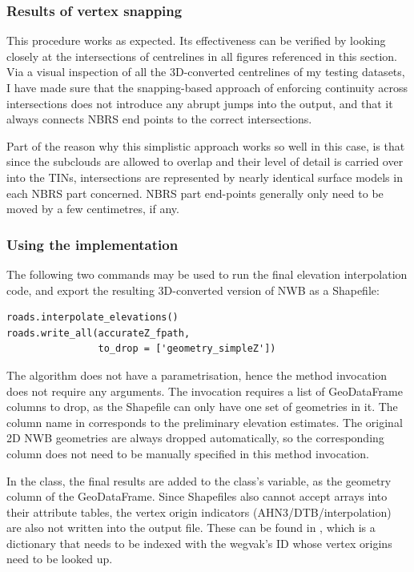 \subsubsection{Results of vertex snapping}

This procedure works as expected. Its effectiveness can be verified by looking closely at the intersections of centrelines in all figures referenced in this section. Via a visual inspection of all the 3D-converted centrelines of my testing datasets,  I have made sure that the snapping-based approach of enforcing continuity across intersections does not introduce any abrupt jumps into the output, and that it always connects NBRS end points to the correct intersections.

Part of the reason why this simplistic approach works so well in this case, is that since the subclouds are allowed to overlap and their level of detail is carried over into the TINs, intersections are represented by nearly identical surface models in each NBRS part concerned. NBRS part end-points generally only need to be moved by a few centimetres, if any.

\subsubsection{Using the implementation}

The following two commands may be used to run the final elevation interpolation code, and export the resulting 3D-converted version of NWB as a Shapefile:

\begin{lstlisting}
roads.interpolate_elevations()
roads.write_all(accurateZ_fpath,
                to_drop = ['geometry_simpleZ'])
\end{lstlisting}

The algorithm does not have a parametrisation, hence the method invocation does not require any arguments. The  invocation requires a list of GeoDataFrame columns to drop, as the Shapefile can only have one set of geometries in it. The column name in  corresponds to the preliminary elevation estimates. The original 2D NWB geometries are always dropped automatically, so the corresponding column does not need to be manually specified in this method invocation.

In the  class, the final results are added to the class's  variable, as the  geometry column of the GeoDataFrame. Since Shapefiles also cannot accept arrays into their attribute tables, the vertex origin indicators (AHN3/DTB/interpolation) are also not written into the output file. These can be found in , which is a dictionary that needs to be indexed with the wegvak's ID whose vertex origins need to be looked up.

